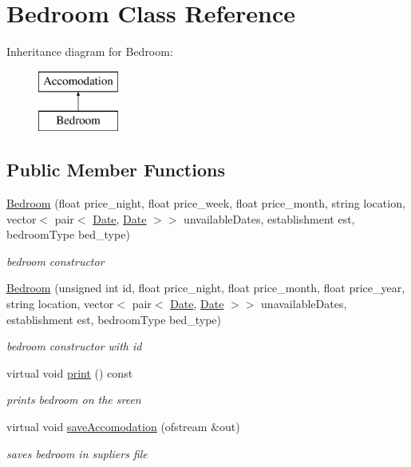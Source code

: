 \hypertarget{class_bedroom}{}\section{Bedroom Class Reference}
\label{class_bedroom}
Inheritance diagram for Bedroom\+:\begin{figure}[H]
\begin{center}
\leavevmode
\includegraphics[height=2.000000cm]{class_bedroom}
\end{center}
\end{figure}
\subsection*{Public Member Functions}
\begin{DoxyCompactItemize}
\item 
\hyperlink{class_bedroom_afd743fa0003f9307e4244c22332e1450}{Bedroom} (float price\+\_\+night, float price\+\_\+week, float price\+\_\+month, string location, vector$<$ pair$<$ \hyperlink{class_date}{Date}, \hyperlink{class_date}{Date} $>$$>$ unvailable\+Dates, establishment est, bedroom\+Type bed\+\_\+type)
\begin{DoxyCompactList}\small\item\em bedroom constructor \end{DoxyCompactList}\item 
\hyperlink{class_bedroom_acb17fca3ff7ec73625142fc5360ebfe3}{Bedroom} (unsigned int id, float price\+\_\+night, float price\+\_\+month, float price\+\_\+year, string location, vector$<$ pair$<$ \hyperlink{class_date}{Date}, \hyperlink{class_date}{Date} $>$$>$ unavailable\+Dates, establishment est, bedroom\+Type bed\+\_\+type)
\begin{DoxyCompactList}\small\item\em bedroom constructor with id \end{DoxyCompactList}\item 
\hypertarget{class_bedroom_a227bb14fc225b8c872d85c84163735de}{}\label{class_bedroom_a227bb14fc225b8c872d85c84163735de} 
virtual void \hyperlink{class_bedroom_a227bb14fc225b8c872d85c84163735de}{print} () const
\begin{DoxyCompactList}\small\item\em prints bedroom on the sreen \end{DoxyCompactList}\item 
virtual void \hyperlink{class_bedroom_ad5d0a12fe0257ba5c14efc6182ee33ce}{save\+Accomodation} (ofstream \&out)
\begin{DoxyCompactList}\small\item\em saves bedroom in supliers file \end{DoxyCompactList}\end{DoxyCompactItemize}
